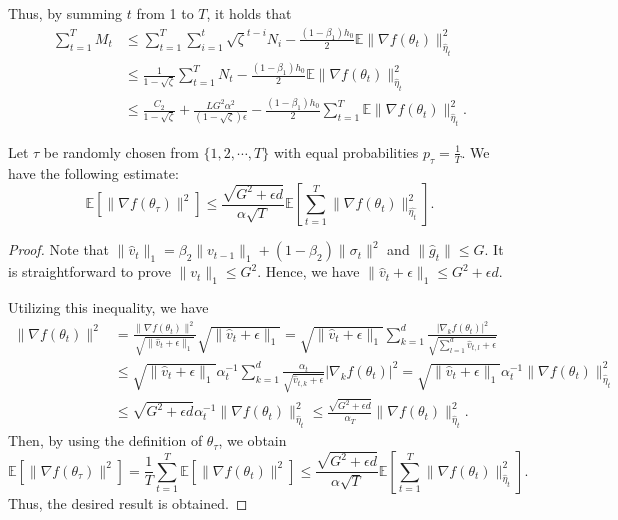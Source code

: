 Thus, by summing $t$ from 1 to $T$, it holds that
\[
\begin{split}
\sum_{t=1}^T M_t &\leq \sum_{t=1}^T \sum_{i=1}^t \sqrt{\zeta}^{t-i} N_i - \frac{(1-\beta_1)h_0}{2}  \mathbb{E} \|\nabla f(\theta_t)\|_{\hat{\eta}_t}^2\\
& \leq \frac{1}{1-\sqrt{\zeta}}\sum_{t=1}^T N_t - \frac{(1-\beta_1)h_0}{2}\mathbb{E} \|\nabla f(\theta_t)\|_{\hat{\eta}_t}^2\\
&\leq \frac{C_2}{1-\sqrt{\zeta}} + \frac{LG^2\alpha^2}{(1-\sqrt{\zeta})\epsilon} - \frac{(1-\beta_1)h_0}{2}\sum_{t=1}^T\mathbb{E} \|\nabla f(\theta_t)\|_{\hat{\eta}_t}^2.
\end{split}
\]
\medskip

\begin{lemma}\label{lem1-007}
  Let $\tau$ be randomly chosen from  $\{1,2,\cdots,T\}$ with equal probabilities $p_\tau = \frac{1}{T}$. We have the following estimate:
  \[ 
  \mathbb{E}[\|\nabla f\left(\theta_\tau\right)\|^2]\leq \frac{\sqrt{G^2+\epsilon d}}{\alpha\sqrt{T}}\mathbb{E}\left[\sum_{t=1}^T\|\nabla f\left(\theta_t\right)\|_{\hat{\eta_t}}^2\right].
  \]
\end{lemma}
\begin{proof}
Note that $\|\hat{v}_t\|_1 = \beta_2 \|v_{t-1}\|_1 +\left(1-\beta_2\right) \|\sigma_t\|^2$ and $\|\hat{g}_t\|\leq G$. It is straightforward to prove $\|v_t\|_1 \leq G^2$. Hence, we have $\|\hat{v}_t + \epsilon\|_1 \leq G^2 + \epsilon d$. 

Utilizing this inequality, we have
\[
\begin{split} 
     \|\nabla f\left(\theta_t\right)\|^2 &= \frac{\|\nabla f\left(\theta_t\right)\|^2}{\sqrt{\|\hat{v}_t+\epsilon\|_1}}\sqrt{\|\hat{v}_t+\epsilon\|_1} = \sqrt{\|\hat{v}_t +\epsilon \|_1}\sum_{k=1}^d\frac{|\nabla_k f\left(\theta_t\right)|^2}{\sqrt{\sum_{l=1}^d \hat{v}_{t,l}+\epsilon}}\\
     &\leq \sqrt{\|\hat{v}_t+\epsilon\|_1}\alpha_t^{-1}\sum_{k=1}^d \frac{\alpha_t}{\sqrt{\hat{v}_{t,k}+\epsilon}}|\nabla_k f\left(\theta_t\right)|^2 
     = \sqrt{\|\hat{v}_t+\epsilon\|_1}\alpha_t^{-1}\|\nabla f\left(\theta_t\right)\|_{\hat{\eta}_t}^2 \\ 
     &\leq \sqrt{G^2+\epsilon d}\alpha_t^{-1}\|\nabla f\left(\theta_t\right)\|_{\hat{\eta}_t}^2 
       \leq \frac{\sqrt{G^2 + \epsilon d}}{\alpha_T}\|\nabla f\left(\theta_t\right)\|^2_{\hat{\eta}_t}.
\end{split}
\]
Then, by using the definition of $\theta_{\tau}$, we obtain
\[
     \mathbb{E}\left[\|\nabla f\left(\theta_\tau\right)\|^2\right] = \frac{1}{T}\sum_{t=1}^T\mathbb{E}\left[\|\nabla f\left(\theta_t\right)\|^2\right] \leq \frac{\sqrt{G^2 + \epsilon d}}{\alpha\sqrt{T}} \mathbb{E}\left[\sum_{t=1}^T \|\nabla f\left(\theta_t\right)\|^2_{\hat{\eta}_t}\right].
\]
Thus, the desired result is obtained. 
\end{proof}


